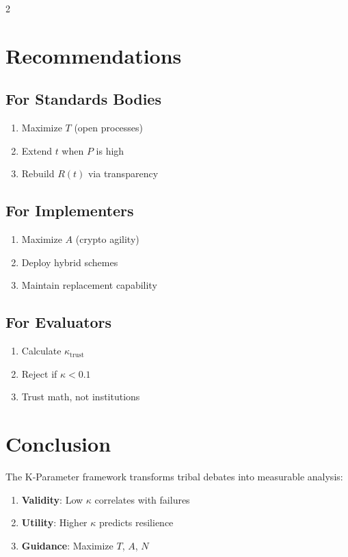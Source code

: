 \documentclass[11pt]{article}
\begin{document}
\begin{multicols}{2}
\section{Recommendations}

\subsection{For Standards Bodies}
\begin{enumerate}[noitemsep]
    \item Maximize $T$ (open processes)
    \item Extend $t$ when $P$ is high
    \item Rebuild $R(t)$ via transparency
\end{enumerate}

\subsection{For Implementers}
\begin{enumerate}[noitemsep]
    \item Maximize $A$ (crypto agility)
    \item Deploy hybrid schemes
    \item Maintain replacement capability
\end{enumerate}

\subsection{For Evaluators}
\begin{enumerate}[noitemsep]
    \item Calculate $\kappa_{\text{trust}}$
    \item Reject if $\kappa < 0.1$
    \item Trust math, not institutions
\end{enumerate}

\section{Conclusion}

The K-Parameter framework transforms tribal debates into measurable analysis:

\begin{enumerate}[noitemsep]
    \item \textbf{Validity}: Low $\kappa$ correlates with failures
    \item \textbf{Utility}: Higher $\kappa$ predicts resilience
    \item \textbf{Guidance}: Maximize $T$, $A$, $N$
\end{enumerate}


\end{multicols}
\end{document}
